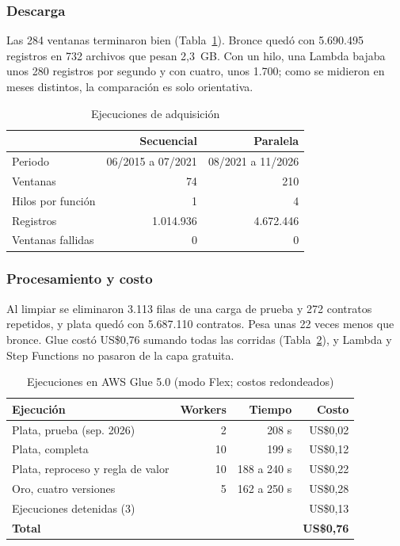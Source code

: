 \subsubsection{Descarga}

Las 284 ventanas terminaron bien (Tabla~\ref{adq:t4}). Bronce quedó con 5.690.495 registros en 732 archivos que pesan 2,3~GB. Con un hilo, una Lambda bajaba unos 280 registros por segundo y con cuatro, unos 1.700; como se midieron en meses distintos, la comparación es solo orientativa.

\begin{table}[!htbp]
\centering
\small
\caption{Ejecuciones de adquisición}\label{adq:t4}
\begin{tabular}{lrr}
\toprule
 & Secuencial & Paralela \\
\midrule
Periodo & 06/2015 a 07/2021 & 08/2021 a 11/2026 \\
Ventanas & 74 & 210 \\
Hilos por función & 1 & 4 \\
Registros & 1.014.936 & 4.672.446 \\
Ventanas fallidas & 0 & 0 \\
\bottomrule
\end{tabular}
\end{table}

\subsubsection{Procesamiento y costo}

Al limpiar se eliminaron 3.113 filas de una carga de prueba y 272 contratos repetidos, y plata quedó con 5.687.110 contratos. Pesa unas 22 veces menos que bronce. Glue costó US\$0,76 sumando todas las corridas (Tabla~\ref{adq:t5}), y Lambda y Step Functions no pasaron de la capa gratuita.

\begin{table}[!htbp]
\centering
\small
\caption{Ejecuciones en AWS Glue 5.0 (modo Flex; costos redondeados)}\label{adq:t5}
\footnotesize
\setlength{\tabcolsep}{3pt}
\begin{tabular}{@{}lrrr@{}}
\toprule
Ejecución & Workers & Tiempo & Costo \\
\midrule
Plata, prueba (sep. 2026) & 2 & 208 s & US\$0,02 \\
Plata, completa & 10 & 199 s & US\$0,12 \\
Plata, reproceso y regla de valor & 10 & 188 a 240 s & US\$0,22 \\
Oro, cuatro versiones & 5 & 162 a 250 s & US\$0,28 \\
Ejecuciones detenidas (3) &  &  & US\$0,13 \\
\textbf{Total} &  &  & \textbf{US\$0,76} \\
\bottomrule
\end{tabular}
\end{table}

